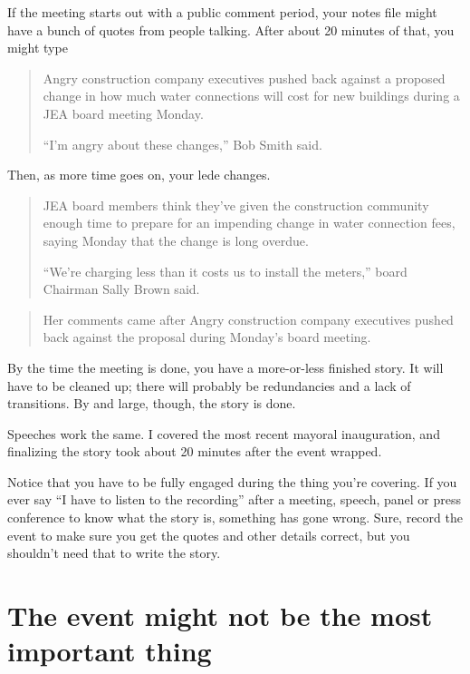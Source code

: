 \documentclass[
  11pt,
  american,
  letterpaperpaper,
  extrafontsizes,onecolumn,openright
  ]{memoir}
\begin{document}
If the meeting starts out with a public comment period, your notes file might have a bunch of quotes from people talking. After about 20 minutes of that, you might type

\begin{quote}
Angry construction company executives pushed back against a proposed change in how much water connections will cost for new buildings during a JEA board meeting Monday.

\enquote{I'm angry about these changes,} Bob Smith said.
\end{quote}

Then, as more time goes on, your lede changes.

\begin{quote}
JEA board members think they've given the construction community enough time to prepare for an impending change in water connection fees, saying Monday that the change is long overdue.

\enquote{We're charging less than it costs us to install the meters,} board Chairman Sally Brown said.
\end{quote}

\begin{quote}
Her comments came after Angry construction company executives pushed back against the proposal during Monday's board meeting.
\end{quote}

By the time the meeting is done, you have a more-or-less finished story. It will have to be cleaned up; there will probably be redundancies and a lack of transitions. By and large, though, the story is done.

Speeches work the same. I covered the most recent mayoral inauguration, and finalizing the story took about 20 minutes after the event wrapped.

Notice that you have to be fully engaged during the thing you're covering. If you ever say \enquote{I have to listen to the recording} after a meeting, speech, panel or press conference to know what the story is, something has gone wrong. Sure, record the event to make sure you get the quotes and other details correct, but you shouldn't need that to write the story.

\hypertarget{the-event-might-not-be-the-most-important-thing}{%
\section*{The event might not be the most important thing}\label{the-event-might-not-be-the-most-important-thing}}
\end{document}
